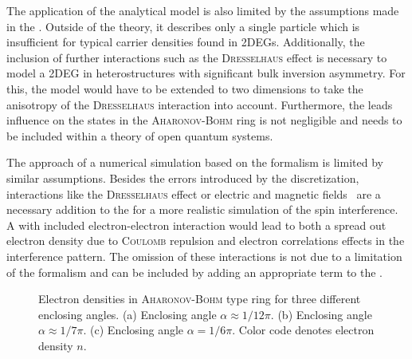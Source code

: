 The application of the analytical model is also limited by the assumptions made in the \hamil{}. Outside of the \gfnc{} theory, it describes only a single particle which is insufficient for typical carrier densities found in 2DEGs. Additionally, the inclusion of further interactions such as the \textsc{Dresselhaus} effect \cite{PhysRev.100.580} is necessary to model a 2DEG in heterostructures with significant bulk inversion asymmetry. For this, the model would have to be extended to two dimensions to take the anisotropy of the \textsc{Dresselhaus} interaction into account. Furthermore, the leads influence on the states in the \textsc{Aharonov-Bohm} ring is not negligible and needs to be included within a theory of open quantum systems.\par The approach of a numerical simulation based on the \gfnc{} formalism is limited by similar assumptions. Besides the errors introduced by the discretization, interactions like the \textsc{Dresselhaus} effect or electric and magnetic fields~\cite{Nitta2002PhysicaE.12.753} are a necessary addition to the \hamil{} for a more realistic simulation of the spin interference. 
A \hamil{} with included electron-electron interaction would lead to both a spread out electron density due to \textsc{Coulomb} repulsion and electron correlations effects in the interference pattern. The omission of these interactions is not due to a limitation of the \gfnc{} formalism and can be included by adding an appropriate term to the \hamil{}.
\begin{figure}[t!]
    \caption{Electron densities in \textsc{Aharonov-Bohm} type ring for three different enclosing angles. (a) Enclosing angle $\alpha\approx 1/12 \pi$. (b) Enclosing angle $\alpha\approx 1/7\pi$. (c) Enclosing angle $\alpha=1/6\pi$. Color code denotes electron density $n$.} 
\end{figure}

